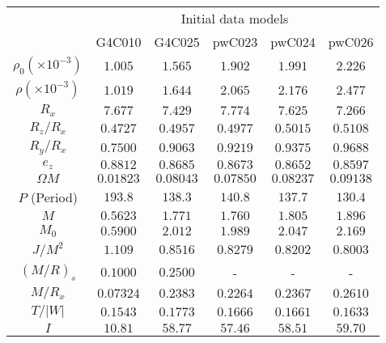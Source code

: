 \documentclass[twocolumn,superscriptaddress,showpacs,prd,aps,amsmath,amssymb,nofootinbib]{revtex4-1}
\newcommand{\GR}{\rho}
\begin{document}
\begin{table}
\begin{tabular}{c|ccccc}
\hline
\hline
   & \multicolumn{5}{c}{Initial data models}  \\
   & G4C010 & G4C025 & pwC023 & pwC024 & pwC026  \\  
\hline
$\GR_0 (\times 10^{-3})$ & $1.005$    & $1.565$    & $1.902$    & $1.991$    & $2.226$   \\  
$\GR   (\times 10^{-3})$ & $1.019$    & $1.644$    & $2.065$    & $2.176$    & $2.477$   \\  
$R_x$                    & $7.677$    & $7.429$    & $7.774$    & $7.625$    & $7.266$   \\  
$R_z/R_x$                & $0.4727$   & $0.4957$   & $0.4977$   & $0.5015$   & $0.5108$   \\  
$R_y/R_x$                & $0.7500$   & $0.9063$   & $0.9219$   & $0.9375$   & $0.9688$  \\  
$e_z$                    & $0.8812$   & $0.8685$   & $0.8673$   & $0.8652$   & $0.8597$ \\  
$\Omega M$               & $0.01823$  & $0.08043$  & $0.07850$  & $0.08237$  & $0.09138$ \\  
$P$ (Period)             & $193.8$    & $138.3$    & $140.8$    & $137.7$    & $130.4$  \\  
$M$                      & $0.5623$   & $1.771$    & $1.760$    & $1.805$    & $1.896$   \\  
$M_0$                    & $0.5900$   & $2.012$    & $1.989$    & $2.047$    & $2.169$   \\  
$J/M^2$                  & $1.109$    & $0.8516$   & $0.8279$   & $0.8202$   & $0.8003$  \\  
$(M/R)_s$                & $0.1000$   & $0.2500$   & -          & -          & -          \\  
$M/R_x$                  & $0.07324$  & $0.2383$   & $0.2264$   & $0.2367$   & $0.2610$  \\  
$T/|W|$                  & $0.1543$   & $0.1773$   & $0.1666$   & $0.1661$   & $0.1633$   \\  
$I$                      & $10.81$    & $58.77$    & $57.46$    & $58.51$    & $59.70$ \\  

\end{tabular}
\end{table}
\end{document}
